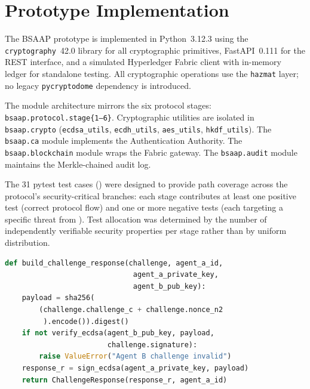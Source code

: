 \documentclass[review,5p,twocolumn,times]{elsarticle}
\begin{document}
\section{Prototype Implementation}\label{sec:impl}

The BSAAP prototype is implemented in Python~3.12.3 using the
\texttt{cryptography}~42.0 library \cite{cryptographylib} for all
cryptographic primitives, FastAPI~0.111 for the REST interface, and a
simulated Hyperledger Fabric client with in-memory ledger for standalone
testing. All cryptographic operations use the \texttt{hazmat} layer; no
legacy \texttt{pycryptodome} dependency is introduced.

The module architecture mirrors the six protocol stages:
\texttt{bsaap.protocol.stage\{1--6\}}.
Cryptographic utilities are isolated in \texttt{bsaap.crypto}
(\texttt{ecdsa\_utils}, \texttt{ecdh\_utils}, \texttt{aes\_utils},
\texttt{hkdf\_utils}). The \texttt{bsaap.ca} module implements the
Authentication Authority. The \texttt{bsaap.blockchain} module wraps the
Fabric gateway. The \texttt{bsaap.audit} module maintains the Merkle-chained
audit log.

The 31 pytest test cases () were designed to provide
path coverage across the protocol's security-critical branches: each stage
contributes at least one positive test (correct protocol flow) and one or
more negative tests (each targeting a specific threat from
).
Test allocation was determined by the number of independently
verifiable security properties per stage rather than by uniform
distribution.

\noindent
\begin{minipage}{\columnwidth}
\begin{lstlisting}[language=Python,caption={Stage 3 challenge-response core
    logic (condensed).},label={lst:cr}]
def build_challenge_response(challenge, agent_a_id,
                              agent_a_private_key,
                              agent_b_pub_key):
    payload = sha256(
        (challenge.challenge_c + challenge.nonce_n2
         ).encode()).digest()
    if not verify_ecdsa(agent_b_pub_key, payload,
                        challenge.signature):
        raise ValueError("Agent B challenge invalid")
    response_r = sign_ecdsa(agent_a_private_key, payload)
    return ChallengeResponse(response_r, agent_a_id)
\end{lstlisting}
\end{minipage}
\end{document}
